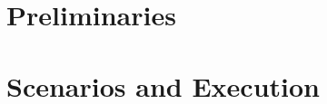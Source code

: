 \label{sec:ExistingImplementation}

\section{Preliminaries}\label{sub:ImplementationPreliminaries}

\section{Scenarios and Execution} \label{sub:implementationScenarios}
